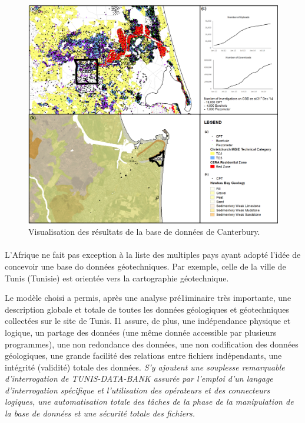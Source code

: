 \begin{figure}[t]
\centering
\includegraphics[width=1\textwidth]{cgd.png}
\caption{Visualisation des résultats de la base de données de Canterbury.}
\end{figure}


\paragraph{}
L'Afrique ne fait pas exception à la liste des multiples pays ayant adopté l'idée
de concevoir une base do données géotechniques.
Par exemple, celle de la ville de Tunis (Tunisie) est orientée vers la cartographie géotechnique.
\par
Le modèle choisi a permis, après une analyse
pré1iminaire très importante, une description globale et
totale de toutes les données géologiques et géotechniques collectées sur le site de Tunis. I1
assure, de plus, une indépendance physique et logique, un partage des données (une même donnée accessible  
par plusieurs programmes), une non redondance des données, une non codification des
données géologiques, une grande facilité des relations
entre fichiers indépendants, une intégrité (validité)
totale des données. 
\textit{S'y ajoutent une souplesse remarquable d'interrogation de TUNIS-DATA-BANK
assurée par l'emploi d'un langage d'interrogation spécifique et l'utilisation des opérateurs et des connecteurs
logiques, une automatisation totale des tâches de la
phase de la manipulation de la base de données et une
sécurité totale des fichiers.}
\cite{tunis}

